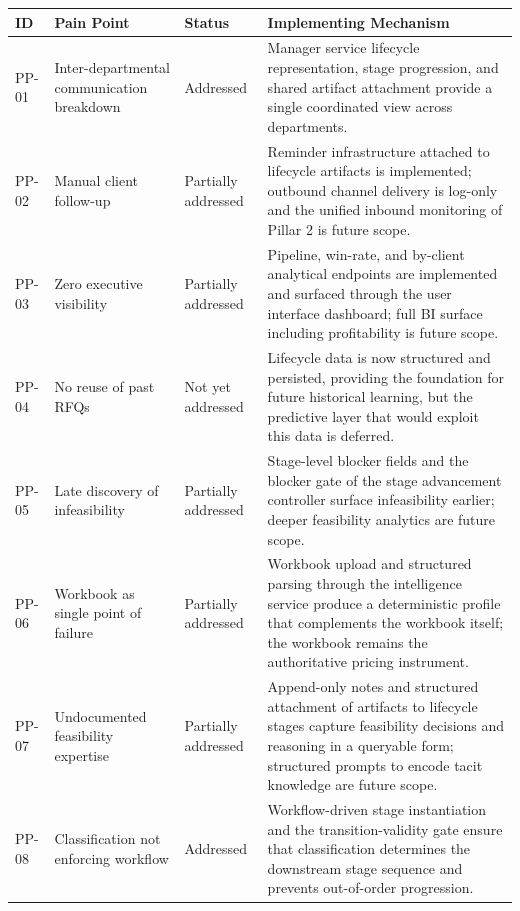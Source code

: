 \begin{table}[H]
\centering
\renewcommand{\arraystretch}{1.4}
\footnotesize
\begin{tabular}{|p{0.8cm}|p{4.2cm}|p{2.2cm}|p{6cm}|}
\hline
\rowcolor{lightgray}
\textbf{ID} & \textbf{Pain Point} & \textbf{Status} & \textbf{Implementing Mechanism} \\ \hline
PP-01 & Inter-departmental communication breakdown & Addressed & Manager service lifecycle representation, stage progression, and shared artifact attachment provide a single coordinated view across departments. \\ \hline
PP-02 & Manual client follow-up & Partially addressed & Reminder infrastructure attached to lifecycle artifacts is implemented; outbound channel delivery is log-only and the unified inbound monitoring of Pillar 2 is future scope. \\ \hline
PP-03 & Zero executive visibility & Partially addressed & Pipeline, win-rate, and by-client analytical endpoints are implemented and surfaced through the user interface dashboard; full BI surface including profitability is future scope. \\ \hline
PP-04 & No reuse of past RFQs & Not yet addressed & Lifecycle data is now structured and persisted, providing the foundation for future historical learning, but the predictive layer that would exploit this data is deferred. \\ \hline
PP-05 & Late discovery of infeasibility & Partially addressed & Stage-level blocker fields and the blocker gate of the stage advancement controller surface infeasibility earlier; deeper feasibility analytics are future scope. \\ \hline
PP-06 & Workbook as single point of failure & Partially addressed & Workbook upload and structured parsing through the intelligence service produce a deterministic profile that complements the workbook itself; the workbook remains the authoritative pricing instrument. \\ \hline
PP-07 & Undocumented feasibility expertise & Partially addressed & Append-only notes and structured attachment of artifacts to lifecycle stages capture feasibility decisions and reasoning in a queryable form; structured prompts to encode tacit knowledge are future scope. \\ \hline
PP-08 & Classification not enforcing workflow & Addressed & Workflow-driven stage instantiation and the transition-validity gate ensure that classification determines the downstream stage sequence and prevents out-of-order progression. \\ \hline

\end{tabular}
\end{table}
